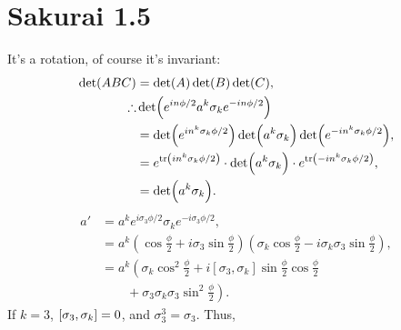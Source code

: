 \documentclass[
a4paper,
10pt,
twoside,
]{article}
\begin{document}
\titleinf
\maketitle
\startmcols

\section{Sakurai 1.5}

It's a rotation, of course it's invariant:
\begin{align}
	\det(ABC) &= \det(A)\det(B)\det(C),\\
	\therefore &\det(e^{i n \phi/2}a^k\sigma_k e^{-i n \phi/2})\\
	&= \det(e^{i n^k\sigma_k \phi/2})\det(a^k\sigma_k)\det(e^{-i n^k\sigma_k \phi/2}),\\
	&= e^{\tr(i n^k\sigma_k \phi/2)} \cdot \det(a^k \sigma_k) \cdot e^{\tr(-i n^k\sigma_k \phi/2)},\\
	&= \det(a^k \sigma_k).
\end{align}
\begin{align}
	a' &= a^k e^{i \sigma_3 \phi/2} \sigma_k e^{-i \sigma_3 \phi/2},\\
	&= a^k \left(\cos\frac{\phi}{2} + i\sigma_3 \sin\frac{\phi}{2}\right) \left(\sigma_k\cos\frac{\phi}{2} - i\sigma_k\sigma_3 \sin\frac{\phi}{2}\right),\\
	&= a^k \left(\sigma_k\cos^2\frac{\phi}{2} + i[\sigma_3,\sigma_k] \sin\frac{\phi}{2}\cos\frac{\phi}{2}\right.\\
	&\qquad+ \left. \sigma_3\sigma_k\sigma_3 \sin^2 \frac{\phi}{2} \right).
\end{align}
If $k = 3$, $\commutator{\sigma_3}{\sigma_k} = 0$, and $\sigma_3^3 = \sigma_3$.
Thus,
\end{document}
